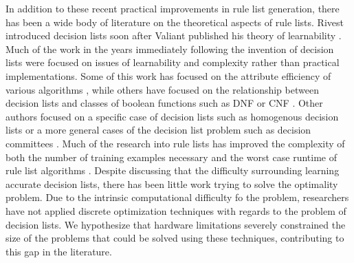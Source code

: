 In addition to these recent practical improvements in rule list generation, there has been a wide body of literature on the theoretical aspects of rule lists.
Rivest introduced decision lists \cite{Rivest87} soon after Valiant published his theory of learnability \cite{Valiant84}.
Much of the work in the years immediately following the invention of decision lists were focused on issues of learnability and complexity rather than practical implementations.
Some of this work has focused on the attribute efficiency of various algorithms \cite{Blum92, DhagatHe94}, while others have focused on the relationship between decision lists and classes of boolean functions such as DNF or CNF \cite{Rivest87, EiterIbMa02}.
Other authors focused on a specific case of decision lists such as homogenous decision lists \cite{SegalOr94} or a more general cases of the decision list problem such as decision committees \cite{NockGa95}.
Much of the research into rule lists has improved the complexity of both the number of training examples necessary and the worst case runtime of rule list algorithms \cite{KlivansSe06}.
Despite discussing that the difficulty surrounding learning accurate decision lists, there has been little work trying to solve the optimality problem.
Due to the intrinsic computational difficulty fo the problem, researchers have not applied discrete optimization techniques with regards to the problem of decision lists.
We hypothesize that hardware limitations severely constrained the size of the problems that could be solved using these techniques, contributing to this gap in the literature.

